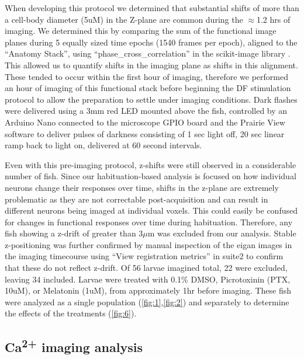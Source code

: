 \documentclass[9pt,lineno]{RandlettLab_elife}
\begin{document}
When developing this protocol we determined that substantial shifts of more than a cell-body diameter (5uM) in the Z-plane are common during the $\approx$1.2 hrs of imaging. We determined this by comparing the sum of the functional image planes during 5 equally sized time epochs (1540 frames per epoch), aligned to the “Anatomy Stack”, using “phase\_cross\_correlation” in the scikit-image library \citep{Van_der_Walt2014-hx}. This allowed us to quantify shifts in the imaging plane as shifts in this alignment.  These tended to occur within the first hour of imaging, therefore we performed an hour of imaging of this functional stack before beginning the DF stimulation protocol to allow the preparation to settle under imaging conditions. Dark flashes were delivered using a 3mm red LED mounted above the fish, controlled by an Arduino Nano connected to the microscope GPIO board and the Prairie View software to deliver pulses of darkness consisting of 1 sec light off, 20 sec linear ramp back to light on, delivered at 60 second intervals. 

Even with this pre-imaging protocol, z-shifts were still observed in a considerable number of fish. Since our habituation-based analysis is focused on how individual neurons change their responses over time, shifts in the z-plane are extremely problematic as they are not correctable post-acquisition and can result in different neurons being imaged at individual voxels. This could easily be confused for changes in functional responses over time during habituation. Therefore, any fish showing a z-drift of greater than 3$\mu$m was excluded from our analysis. Stable z-positioning was further confirmed by manual inspection of the eigan images in the imaging timecourse using “View registration metrics” in suite2 to confirm that these do not reflect z-drift. Of 56 larvae imagined total, 22 were excluded, leaving 34 included. Larvae were treated with 0.1\% DMSO, Picrotoxinin (PTX, 10uM), or Melatonin (1uM), from approximately 1hr before imaging. These fish were analyzed as a single population (\autoref{fig:1},\autoref{fig:2}) and separately to determine the effects of the treatments (\autoref{fig:6}). 

\subsection{Ca\textsuperscript{2+} imaging analysis}
\end{document}
